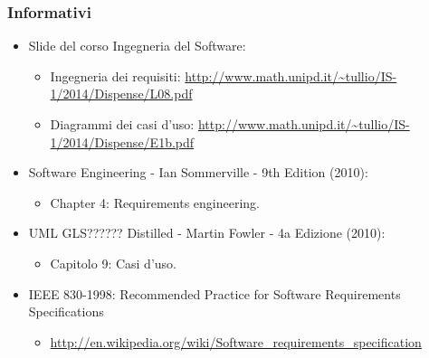 \subsubsection{Informativi}
\begin{itemize}
	\item Slide del corso Ingegneria del Software:
	\begin{itemize}
		\item Ingegneria dei requisiti: \url{http://www.math.unipd.it/~tullio/IS-1/2014/Dispense/L08.pdf}
		\item Diagrammi dei casi d'uso: \url{http://www.math.unipd.it/~tullio/IS-1/2014/Dispense/E1b.pdf}
	\end{itemize}
	\item Software Engineering - Ian Sommerville - 9th Edition (2010):
	\begin{itemize}
		\item Chapter 4: Requirements engineering.
	\end{itemize}
	\item UML GLS?????? Distilled - Martin Fowler - 4a Edizione (2010):
	\begin{itemize}
		\item Capitolo 9: Casi d’uso.
	\end{itemize}
	\item IEEE 830-1998: Recommended Practice for Software Requirements Specifications
	\begin{itemize}
		\item \url{http://en.wikipedia.org/wiki/Software_requirements_specification}
	\end{itemize}
\end{itemize}